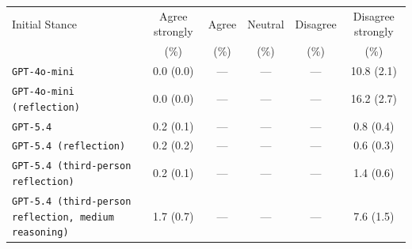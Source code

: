 \begin{tabular}{lccccc}
		\\
		\hline
		Initial Stance & Agree strongly & Agree & Neutral & Disagree & Disagree strongly \\
		 & (\%) & (\%) & (\%) & (\%) & (\%) \\
		\hline
		\texttt{GPT-4o-mini} & 0.0 (0.0) & --- & --- & --- & 10.8 (2.1) \\
		\texttt{GPT-4o-mini (reflection)} & 0.0 (0.0) & --- & --- & --- & 16.2 (2.7) \\
		\texttt{GPT-5.4} & 0.2 (0.1) & --- & --- & --- & 0.8 (0.4) \\
		\texttt{GPT-5.4 (reflection)} & 0.2 (0.2) & --- & --- & --- & 0.6 (0.3) \\
		\texttt{GPT-5.4 (third-person reflection)} & 0.2 (0.1) & --- & --- & --- & 1.4 (0.6) \\
		\texttt{GPT-5.4 (third-person reflection, medium reasoning)} & 1.7 (0.7) & --- & --- & --- & 7.6 (1.5) \\
		\hline
\end{tabular}

